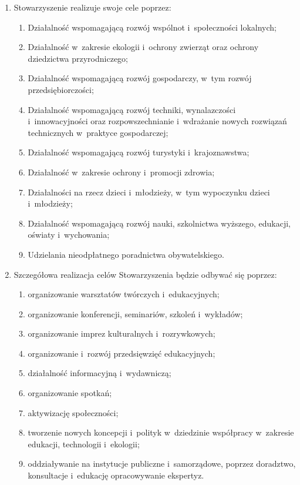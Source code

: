 \documentclass[11pt,a4paper]{article}
\begin{document}
\begin{enumerate}
  \item Stowarzyszenie realizuje swoje cele poprzez:
  \begin{enumerate}
    \item Działalność wspomagającą rozwój wspólnot i~społeczności lokalnych;
    \item Działalność w~zakresie ekologii i~ochrony zwierząt oraz ochrony dziedzictwa przyrodniczego;
    \item Działalność wspomagającą rozwój gospodarczy, w~tym rozwój przedsiębiorczości;
    \item Działalność wspomagającą rozwój techniki, wynalazczości i~innowacyjności oraz rozpowszechnianie i~wdrażanie nowych rozwiązań technicznych w~praktyce gospodarczej;
    \item Działalność wspomagającą rozwój turystyki i~krajoznawstwa;
    \item Działalność w~zakresie ochrony i~promocji zdrowia;
    \item Działalności na rzecz dzieci i~młodzieży, w~tym wypoczynku dzieci i~młodzieży;
    \item Działalność wspomagającą rozwój nauki, szkolnictwa wyższego, edukacji, oświaty i~wychowania;
    \item Udzielania nieodpłatnego poradnictwa obywatelskiego.
  \end{enumerate}

  \item Szczegółowa realizacja celów Stowarzyszenia będzie odbywać się poprzez:
  \begin{enumerate}
    \item organizowanie warsztatów twórczych i~edukacyjnych;
    \item organizowanie konferencji, seminariów, szkoleń i~wykładów;
    \item organizowanie imprez kulturalnych i~rozrywkowych;
    \item organizowanie i~rozwój przedsięwzięć edukacyjnych;
    \item działalność informacyjną i~wydawniczą;
    \item organizowanie spotkań;
    \item aktywizację społeczności;
    \item tworzenie nowych koncepcji i~polityk w~dziedzinie współpracy w~zakresie edukacji, technologii i~ekologii;
    \item oddziaływanie na instytucje publiczne i~samorządowe, poprzez doradztwo, konsultacje i~edukację opracowywanie ekspertyz.
  \end{enumerate}


\end{enumerate}
\end{document}
